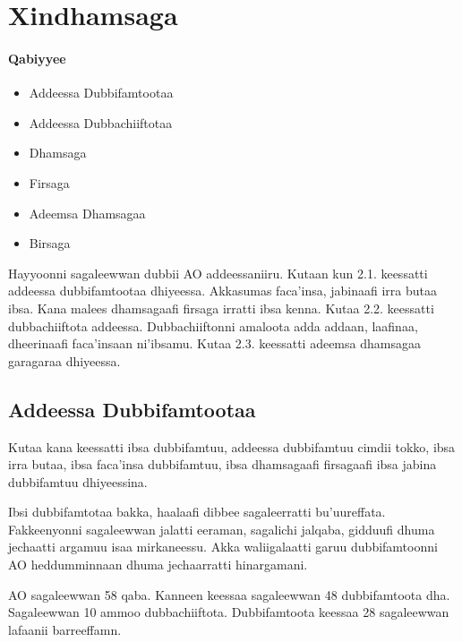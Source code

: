 \documentclass[11pt,b5paper]{book}
\begin{document}
\chapter{Xindhamsaga}
\setlength{\parindent}{3em}
\subsubsection{Qabiyyee}

\begin{itemize}
  \item Addeessa Dubbifamtootaa
  \item Addeessa Dubbachiiftotaa
  \item Dhamsaga
  \item Firsaga
  \item Adeemsa Dhamsagaa
  \item Birsaga
\end{itemize}

Hayyoonni sagaleewwan dubbii AO addeessaniiru\cite{griefenow2001grammatical,owens1985grammar,wako1981}. Kutaan kun 2.1.  keessatti addeessa dubbifamtootaa dhiyeessa. Akkasumas  faca’insa, jabinaafi irra butaa ibsa. Kana malees dhamsagaafi  firsaga irratti ibsa kenna. Kutaa 2.2. keessatti dubbachiiftota  addeessa. Dubbachiiftonni amaloota adda addaan, laafinaa,
dheerinaafi faca’insaan ni’ibsamu. Kutaa 2.3. keessatti  adeemsa dhamsagaa garagaraa dhiyeessa.
  
\section{Addeessa Dubbifamtootaa}

Kutaa kana keessatti ibsa dubbifamtuu, addeessa dubbifamtuu  cimdii tokko, ibsa irra butaa, ibsa faca’insa dubbifamtuu, ibsa  dhamsagaafi firsagaafi ibsa jabina dubbifamtuu dhiyeessina.

Ibsi dubbifamtotaa bakka, haalaafi dibbee sagaleerratti  bu’uureffata. Fakkeenyonni sagaleewwan jalatti eeraman,  sagalichi jalqaba, gidduufi dhuma jechaatti argamuu isaa  mirkaneessu. Akka waliigalaatti garuu dubbifamtoonni AO  heddumminnaan dhuma jechaarratti hinargamani. 

AO sagaleewwan 58 qaba. Kanneen keessaa sagaleewwan 48 dubbifamtoota dha. Sagaleewwan 10 ammoo dubbachiiftota. Dubbifamtoota keessaa 28 sagaleewwan lafaanii barreeffamn. 
\end{document}
